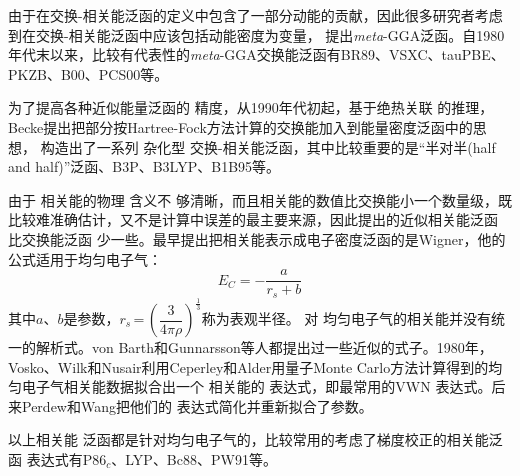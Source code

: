 由于在交换-相关能泛函的定义中包含了一部分动能的贡献，因此很多研究者考虑{到}在交换-相关{能}泛函中应该包括动能密度为变量，%
{提出}\textit{meta}-GGA泛函。自1980年代末以来，比较有代表性的\textit{meta}-GGA交换能泛函有BR89\cite{PRA39-3761_1989}、\linebreak VSXC\cite{JCP109-400_1998}、tauPBE\cite{JCP111-911_1999}、PKZB\cite{PRL82-2544_1999,PRL82-5179_1999}、B00\cite{JCP112-4020_2000}、PCS00\cite{JCP113-10013_2000}等。

为了提高各种近似{能量}泛函的%
精度，从1990年代初起，基于绝热关联%
{的推理}，Becke提出把部分按Hartree-Fock方法计算的交换能加入到能量密度泛函中的思想{，}%
构造出了一系列%
杂化型%
交换-相关{能}泛函，其中比较重要的是“半对半(half and half)”泛函\cite{JCP98-1372_1993}、B3P\cite{JCP98-5648_1993}、B3LYP\cite{JPC98-11623_1994}、B1B95\cite{JCP104-1040_1995}等。

由于%
相关能的物理%
{含}义不%
{够}清晰，而且相关能的数值比交换能小一个数量级，既比较难准确估计，又不是计算中误差的最主要来源，因此提出的{近似}相关能泛函%
比交换能泛函%
少一些。最早提出把相关能表示成电子密度泛函的是Wigner\cite{PR46-1002_1934}，他的公式适用于均匀电子气：
\begin{equation}
  E_C=-\dfrac a{r_s+b}
  \label{eq:dft-16}
\end{equation}
其中$a$、$b$是参数，$r_s$\,=\,$\left(\dfrac3{4\pi\rho}\right)^{\frac13}$称为表观半径。%
对%
均匀电子气的相关能并没有统一\linebreak 的解析式。von Barth\cite{JPC5-1629_1972}和Gunnarsson\cite{PRB13-4274_1976}等人都提出过一些近似的式子。1980年，\linebreak Vosko、Wilk和Nusair\cite{CJP58-1200_1980}利用Ceperley和Alder\cite{PRL45-566_1980}用量子Monte Carlo方法计算得到的{均匀电子气}相关能数据拟合出一个%
相关能的%
{表达}式，即最常用的VWN%
{表达}式。后来Perdew和Wang\cite{PRB45-13244_1992}把他们的%
{表达}式简化并重新拟合了参数。

以上相关能%
{泛函}都是针对均匀电子气的，比较常用的考虑了梯度校正的相关能泛函%
{表达}式有P86$_c$\cite{PRB33-8822_1986}、LYP\cite{PRB37-785_1988}、Bc88\cite{JCP88-1053_1988}、PW91\cite{PRB46-6671_1992,PRB48-4978_1993,PRB54-16533_1996,PRB57-14999_1998}等。

